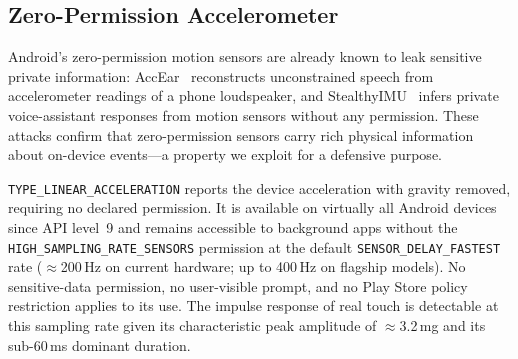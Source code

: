 \subsection{Zero-Permission Accelerometer}
\label{sec:bg_sensor}

Android's zero-permission motion sensors are already known to leak sensitive private
information: AccEar~\cite{accear2022} reconstructs unconstrained speech from accelerometer
readings of a phone loudspeaker, and StealthyIMU~\cite{stealthyimu2023} infers private
voice-assistant responses from motion sensors without any permission.%
These attacks confirm that zero-permission sensors carry rich physical information about
on-device events---a property we exploit for a defensive purpose.%

\texttt{TYPE\_LINEAR\_ACCELERATION} reports the
device acceleration with gravity removed, requiring no declared permission.%
It is available on virtually all Android devices since API level~9 and remains
accessible to background apps without the \texttt{HIGH\_SAMPLING\_RATE\_SENSORS}
permission at the default \texttt{SENSOR\_DELAY\_FASTEST} rate
($\approx$200\,Hz on current hardware; up to 400\,Hz on flagship models).%
No sensitive-data permission, no user-visible prompt, and no Play Store policy
restriction applies to its use.%
The impulse response of real touch is detectable at this sampling rate given its
characteristic peak amplitude of $\approx$3.2\,mg and its
sub-60\,ms dominant duration.%
